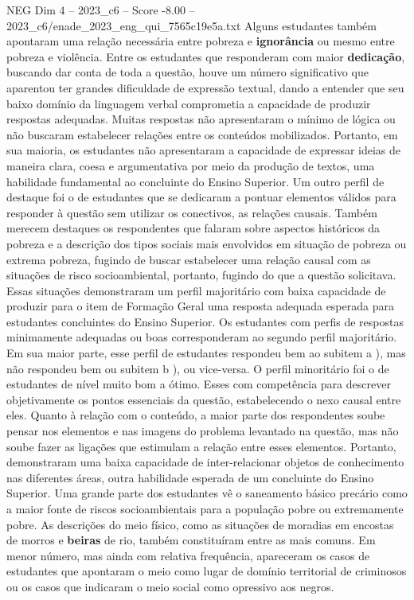 \begin{textsample}{NEG Dim 4 – 2023\_c6 – Score -8.00 – 2023\_c6/enade\_2023\_eng\_qui\_7565c19e5a.txt}
Alguns estudantes também apontaram uma relação necessária entre pobreza e \textbf{ignorância} ou mesmo entre pobreza e violência.
Entre os estudantes que responderam com maior \textbf{dedicação}, buscando dar conta de toda a questão, houve um número significativo que aparentou ter grandes dificuldade de expressão textual, dando a entender que seu baixo domínio da linguagem verbal comprometia a capacidade de produzir respostas adequadas.
Muitas respostas não apresentaram o mínimo de lógica ou não buscaram estabelecer relações entre os conteúdos mobilizados.
Portanto, em sua maioria, os estudantes não apresentaram a capacidade de expressar ideias de maneira clara, coesa e argumentativa por meio da produção de textos, uma habilidade fundamental ao concluinte do Ensino Superior.
Um outro perfil de destaque foi o de estudantes que se dedicaram a pontuar elementos válidos para responder à questão sem utilizar os conectivos, as relações causais.
Também merecem destaques os respondentes que falaram sobre aspectos históricos da pobreza e a descrição dos tipos sociais mais envolvidos em situação de pobreza ou extrema pobreza, fugindo de buscar estabelecer uma relação causal com as situações de risco socioambiental, portanto, fugindo do que a questão solicitava.
Essas situações demonstraram um perfil majoritário com baixa capacidade de produzir para o item de Formação Geral uma resposta adequada esperada para estudantes concluintes do Ensino Superior.
Os estudantes com perfis de respostas minimamente adequadas ou boas corresponderam ao segundo perfil majoritário.
Em sua maior parte, esse perfil de estudantes respondeu bem ao subitem a ), mas não respondeu bem ou subitem b ), ou vice-versa.
O perfil minoritário foi o de estudantes de nível muito bom a ótimo.
Esses com competência para descrever objetivamente os pontos essenciais da questão, estabelecendo o nexo causal entre eles.
Quanto à relação com o conteúdo, a maior parte dos respondentes soube pensar nos elementos e nas imagens do problema levantado na questão, mas não soube fazer as ligações que estimulam a relação entre esses elementos.
Portanto, demonstraram uma baixa capacidade de inter-relacionar objetos de conhecimento nas diferentes áreas, outra habilidade esperada de um concluinte do Ensino Superior.
Uma grande parte dos estudantes vê o saneamento básico precário como a maior fonte de riscos socioambientais para a população pobre ou extremamente pobre.
As descrições do meio físico, como as situações de moradias em encostas de morros e \textbf{beiras} de rio, também constituíram entre as mais comuns.
Em menor número, mas ainda com relativa frequência, apareceram os casos de estudantes que apontaram o meio como lugar de domínio territorial de criminosos ou os casos que indicaram o meio social como opressivo aos negros.

\end{textsample}
